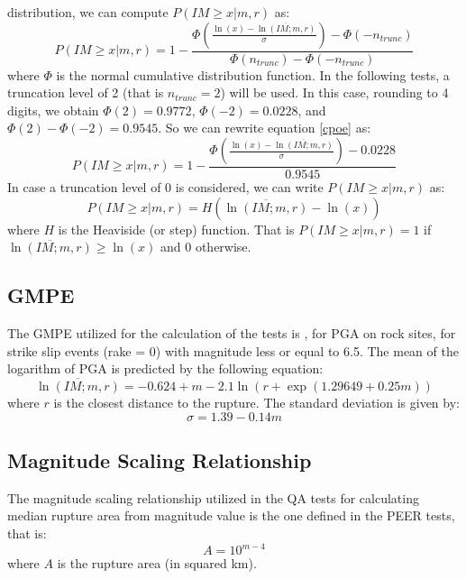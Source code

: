 distribution, we can compute $P(IM\geq x | m,r)$ as:
\begin{equation}
\label{cpoe}
P(IM\geq x | m,r) = 1 - \frac{\Phi(\frac{\ln(x) - \overline{\ln(IM;m,r)}} {\sigma}) - \Phi(-n_{trunc})}
					{\Phi(n_{trunc}) - \Phi(-n_{trunc})}
\end{equation}
where $\Phi$ is the normal cumulative distribution function. In the following
tests, a truncation level of 2 (that is $n_{trunc}=2$) will be used. In this
case, rounding to 4 digits, we obtain
$\Phi(2)=0.9772$, $\Phi(-2)=0.0228$, and $\Phi(2) - \Phi(-2)=0.9545$.
So we can rewrite equation \ref{cpoe} as: 
\label{cpoe2}
\begin{equation}
P(IM\geq x | m,r) = 1 - \frac{\Phi(\frac{\ln(x) - \overline{\ln(IM;m,r)}} {\sigma}) -0.0228}
					{0.9545}
\end{equation}
In case a truncation level of 0 is considered, we can write $P(IM\geq x | m,r)$ as:
\begin{equation}
\label{cpoe_0_trunc}
P(IM\geq x | m,r) = H(\overline{\ln(IM;m,r)} - \ln(x))
\end{equation}
where $H$ is the Heaviside (or step) function. That is $P(IM\geq x | m,r)=1$ if
$\overline{\ln(IM;m,r)} \geq \ln(x)$ and $0$
otherwise.
\subsection{GMPE}
The GMPE utilized for the calculation of the tests is \textcite{sadigh1997}, 
for PGA on rock sites, for strike slip events (rake = 0) with magnitude less or
equal to 6.5. The mean of the logarithm of PGA is predicted by the following
equation:
\begin{equation}
\label{meanPGA}
\overline{\ln(IM;m,r)} = -0.624 + m - 2.1 \ln(r + \exp(1.29649 + 0.25 m))
\end{equation}
where $r$ is the closest distance to the rupture. The standard deviation is given by:
\begin{equation}
\label{sigmaPGA}
\sigma = 1.39 - 0.14 m
\end{equation}
\subsection{Magnitude Scaling Relationship}
The magnitude scaling relationship utilized in the QA tests for calculating median rupture area from magnitude value is the
one defined in the PEER tests, that is:
\begin{equation}
\label{msr}
A = 10^{m - 4}
\end{equation}
where $A$ is the rupture area (in squared km).
%

